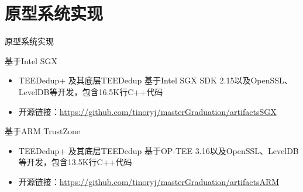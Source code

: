 \documentclass{beamer}
\newcommand{\sysnameS}{TEEDedup }
\newcommand{\prototype}{TEEDedup+ }
\begin{document}





\section{原型系统实现}

\begin{frame}{原型系统实现}
    \begin{textbox}{基于Intel SGX}
        \begin{itemize}
            \item \prototype 及其底层\sysnameS 基于Intel SGX SDK 2.15以及OpenSSL、LevelDB等开发，包含16.5K行C++代码
            \item 开源链接：\href{https://github.com/tinoryj/masterGraduation/artifactsSGX}{https://github.com/tinoryj/masterGraduation/artifactsSGX}
        \end{itemize}
    \end{textbox}

    \begin{textbox}{基于ARM TrustZone}
        \begin{itemize}
            \item \prototype 及其底层\sysnameS 基于OP-TEE 3.16以及OpenSSL、LevelDB等开发，包含13.5K行C++代码
            \item 开源链接：\href{https://github.com/tinoryj/masterGraduation/artifactsARM}{https://github.com/tinoryj/masterGraduation/artifactsARM}
        \end{itemize}
    \end{textbox}
\end{frame}
\end{document}
